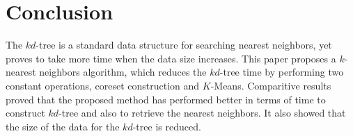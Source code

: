 \documentclass[runningheads]{llncs}
\begin{document}
\section{Conclusion}
\label{sec:6}
The $kd$-tree is a standard data structure for searching nearest neighbors, yet proves to take more time when the data size increases. This paper proposes a $k$-nearest neighbors algorithm, which reduces the $kd$-tree time by performing two constant operations, coreset construction and $K$-Means. Comparitive results proved that the proposed method has performed better in terms of time to construct $kd$-tree and also to retrieve the nearest neighbors. It also showed that the size of the data for the $kd$-tree is reduced.

%
%
%
% 
% 
%
%
%
%
%

\end{document}

